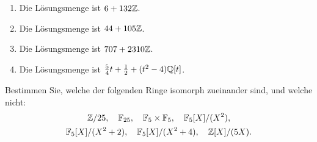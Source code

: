 \begin{solution}
  \begin{enumerate}
    \item
      Die Lösungsmenge ist $6 + 132 \mathbb{Z}$.
    \item
      Die Lösungsmenge ist $44 + 105 \mathbb{Z}$.
    \item
      Die Lösungsmenge ist $707 + 2310 \mathbb{Z}$.
    \item
      Die Lösungsmenge ist $\frac{5}{4}t + \frac{1}{2} + (t^2 - 4) \mathbb{Q}[t]$.
  \end{enumerate}
\end{solution}


 \begin{question}[subtitle = Isomorphiepuzzle]
  Bestimmen Sie, welche der folgenden Ringe isomorph zueinander sind, und welche nicht:
  \begin{gather*}
    \mathbb{Z}/25,
    \quad
    \mathbb{F}_{25},
    \quad
    \mathbb{F}_5 \times \mathbb{F}_5,
    \quad
    \mathbb{F}_5[X]/(X^2),
    \\
    \mathbb{F}_5[X]/(X^2+2),
    \quad
    \mathbb{F}_5[X]/(X^2+4),
    \quad
    \mathbb{Z}[X]/(5X).
  \end{gather*}
\end{question}


